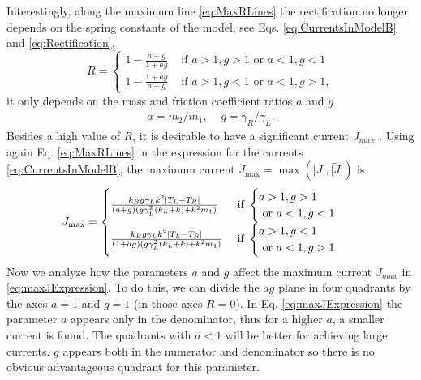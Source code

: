 Interestingly, along the maximum line  \eqref{eq:MaxRLines} the rectification no longer depends on the spring constants of the model,
see  Eqs. \eqref{eq:CurrentsInModelB}  and \eqref{eq:Rectification},
%
\begin{equation}
    R=
    \begin{cases}
      1-\frac{a+g}{1+ag} &\text{ if }a>1,g>1\text{ or }a<1,g<1\\
      1-\frac{1+ag}{a+g} &\text{ if }a>1,g<1\text{ or }a<1,g>1,
    \end{cases}
  \label{eq:maxRExpression}
\end{equation}
%
it only depends on the mass and friction coefficient ratios $a$ and $g$
%
\begin{align}
  a = m_2/m_1,\;\;\;\;
  g = \gamma_R/\gamma_L.
\end{align}
%
Besides a high value of $R$, it is desirable to have a significant current $J_{max}$
\cite{Simon2019}. Using again  Eq. \eqref{eq:MaxRLines} in the expression for the currents \eqref{eq:CurrentsInModelB}, the maximum current $J_{\max} = \max(\big|{J}\big|,\big|\tilde{J}\big|)$ is
%
\begin{align}
    &J_{\max}=\begin{cases}
   \frac{k_B g\gamma_L k^2 \abs{T_L-T_R}}{(a+g)(g\gamma_L^2(k_L+k)+k^2m_1)} &
   \text{ if }\begin{cases}a>1,g>1\\
   \text{ or }a<1,g<1\end{cases}
    \\
    \frac{k_B g\gamma_L k^2 \abs{T_L-T_R}}{(1+ag)(g\gamma_L^2(k_L+k)+k^2m_1)}&\text{ if }
    \begin{cases}a>1,g<1
    \\\text{ or }a<1,g>1\end{cases}
    \end{cases}
    \label{eq:maxJExpression}
\end{align}
%
Now we analyze how the parameters $a$ and $g$ affect the maximum current $J_{max}$ in \eqref{eq:maxJExpression}. To do this, we can divide the $ag$ plane in four quadrants by the axes $a = 1$ and $g = 1$ (in those axes $R = 0$). In Eq. \eqref{eq:maxJExpression} the parameter $a$ appears only in the denominator, thus for a higher $a$, a smaller current is found. The quadrants with $a < 1$ will be better for achieving large currents. $g$ appears both in the numerator and denominator so there is no obvious advantageous quadrant for this parameter.

